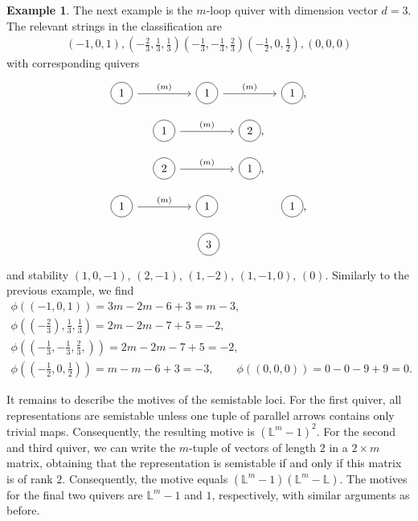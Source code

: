 \documentclass[10pt,a4paper]{amsart}
\newcommand\circlearound[1]{
 \tikz[baseline]\node[draw,shape=circle,anchor=base] {#1} ;}
\numberwithin{equation}{section}
\theoremstyle{definition}
\newtheorem{Example}[Theorem]{Example}
\begin{document}
\begin{Example}
The next example is the $m$-loop quiver with dimension vector $d =3$. The relevant strings in the classification are
\begin{align*}
(-1,0,1), \left(-\frac{2}{3},\frac{1}{3},\frac{1}{3}\right)\left(-\frac{1}{3},-\frac{1}{3},\frac{2}{3}\right) \left(-\frac{1}{2},0, \frac{1}{2}\right), (0,0,0)
\end{align*}
with corresponding quivers
\[\begin{tikzcd}
	\circlearound{1} && \circlearound{1} && \circlearound{1}
	\arrow[from=1-1, to=1-3, "(m)"] \arrow[from=1-3, to=1-5, "(m)"] ,
\end{tikzcd}\]
\[\begin{tikzcd}
	\circlearound{1} && \circlearound{2}
	\arrow[from=1-1, to=1-3, "(m)"] ,
\end{tikzcd}\]
\[\begin{tikzcd}
	\circlearound{2} && \circlearound{1}
	\arrow[from=1-1, to=1-3, "(m)"] ,
\end{tikzcd}\]
\[\begin{tikzcd}
	\circlearound{1} && \circlearound{1} && \circlearound{1}
	\arrow[from=1-1, to=1-3, "(m)"] ,
\end{tikzcd}\]
\[\begin{tikzcd}
	\circlearound{3}
\end{tikzcd}\]
and stability
$(1,0,-1)$, $(2,-1)$, $(1,-2)$, $(1,-1,0)$, $(0) $.
Similarly to the previous example, we find
\begin{gather*}
\phi((-1,0,1)) = 3m -2m -6+3 = m -3 ,\\
\phi\left(\left(-\frac{2}{3}\right), \frac{1}{3},\frac{1}{3}\right) = 2m -2m -7+5 = -2, \\
\phi\left(\left(-\frac{1}{3},-\frac{1}{3},\frac{2}{3},\right)\right) = 2m -2m - 7+ 5 = -2,\\
\phi\left(\left(-\frac{1}{2},0, \frac{1}{2}\right)\right) = m-m -6+3 = -3,\qquad
\phi((0,0,0)) = 0 -0 -9+9 = 0.
\end{gather*}

It remains to describe the motives of the semistable loci. For the first quiver, all representations are semistable unless one tuple of parallel arrows contains only trivial maps. Consequently, the resulting motive is $(\mathbb{L}^m -1)^2$. For the second and third quiver, we can write the $m$-tuple of vectors of length $2$ in a $2 \times m$ matrix, obtaining that the representation is semistable if and only if this matrix is of rank $2$. Consequently, the motive equals $(\mathbb{L}^m -1 )(\mathbb{L}^m - \mathbb{L})$. The motives for the final two quivers are $\mathbb{L}^m -1$ and $1$, respectively, with similar arguments as before.


\end{Example}
\end{document}
